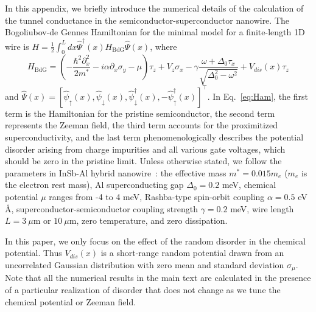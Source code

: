 \documentclass[aps,prmaterials,twocolumn,superscriptaddress,longbibliography]{revtex4-2}
\begin{document}
In this appendix, we briefly introduce the numerical details of the calculation of the tunnel conductance in the semiconductor-superconductor nanowire. The Bogoliubov-de Gennes Hamiltonian for the minimal model for a finite-length 1D wire is $H=\frac12\int_{0}^L dx \hat{\Psi}^\dagger(x)H_{\text{BdG}}\hat{\Psi}(x)$, where~\cite{lutchyn2010majorana,sau2010nonabelian,sau2010generic,oreg2010helical}
\begin{equation}\label{eq:Ham}
    H_{\text{BdG}}=\left(-\frac{\hbar^2\partial_x^2}{2m^*}-i\alpha\partial_x\sigma_y-\mu\right)\tau_z+V_z\sigma_x-\gamma\frac{\omega+\Delta_0\tau_x}{\sqrt{\Delta_0^2-\omega^2}}+V_{dis}(x)\tau_z
\end{equation}
and $\hat{\Psi}(x)=\left[\hat{\psi}_{\uparrow}(x),\hat{\psi}_{\downarrow}(x),\hat{\psi}_{\downarrow}^\dagger(x),-\hat{\psi}_{\uparrow}^\dagger(x)\right]^\intercal$. In Eq.~\eqref{eq:Ham}, the first term is the Hamiltonian for the pristine semiconductor, the second term represents the Zeeman field, the third term accounts for the proximitized superconductivity, and the last term phenomenologically describes the potential disorder arising from charge impurities and all various gate voltages, which should be zero in the pristine limit. Unless otherwise stated, we follow the parameters in InSb-Al hybrid nanowire~\cite{lutchyn2018majorana}: the effective mass $m^*=0.015m_e$ ($m_e$  is the electron rest mass), Al superconducting gap $\Delta_0=0.2$ meV, chemical potential $\mu$ ranges from -4 to 4 meV, Rashba-type spin-orbit coupling $\alpha=0.5$ eV \AA, superconductor-semiconductor coupling strength $\gamma=0.2$ meV, wire length $L=3~\mu$m or $10~\mu$m, zero temperature, and zero dissipation. 

In this paper, we only focus on the effect of the random disorder in the chemical potential. Thus $V_{dis}(x)$ is a short-range random potential drawn from an uncorrelated Gaussian distribution with zero mean and standard deviation $\sigma_\mu$. Note that all the numerical results in the main text are calculated in the presence of a particular realization of disorder that does not change as we tune the chemical potential or Zeeman field. 
\end{document}
